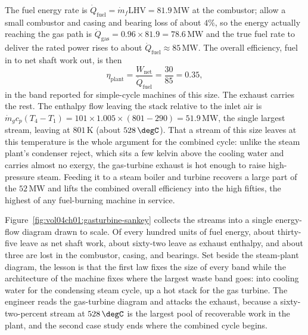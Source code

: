The fuel energy rate is $\dot{Q}_{\text{fuel}} = \dot{m}_f \text{LHV} =
81.9\,\text{MW}$ at the combustor; allow a small combustor and casing and
bearing loss of about $4\%$, so the energy actually reaching the gas path
is $\dot{Q}_{\text{gas}} = 0.96 \times 81.9 = 78.6\,\text{MW}$ and the
true fuel rate to deliver the rated power rises to about
$\dot{Q}_{\text{fuel}} \approx 85\,\text{MW}$. The overall efficiency,
fuel in to net shaft work out, is then
\[
\eta_{\text{plant}} = \frac{W_{\text{net}}}{\dot{Q}_{\text{fuel}}}
  = \frac{30}{85} = 0.35,
\]
in the band reported for simple-cycle machines of this size. The exhaust
carries the rest. The enthalpy flow leaving the stack relative to the
inlet air is $\dot{m}_g c_p (T_4 - T_1) = 101 \times 1.005 \times
(801 - 290) = 51.9\,\text{MW}$, the single largest stream, leaving at
$801\,\si{\kelvin}$ (about $528\,\degC$). That a stream of this size
leaves at this temperature is the whole argument for the combined cycle:
unlike the steam plant's condenser reject, which sits a few kelvin above
the cooling water and carries almost no exergy, the gas-turbine exhaust
is hot enough to raise high-pressure steam. Feeding it to a steam boiler
and turbine recovers a large part of the $52\,\text{MW}$ and lifts the
combined overall efficiency into the high fifties, the highest of any
fuel-burning machine in service.

Figure~\ref{fig:vol04ch01:gasturbine-sankey} collects the streams into a
single energy-flow diagram drawn to scale. Of every hundred units of fuel
energy, about thirty-five leave as net shaft work, about sixty-two leave
as exhaust enthalpy, and about three are lost in the combustor, casing,
and bearings. Set beside the steam-plant diagram, the lesson is that the
first law fixes the size of every band while the architecture of the
machine fixes where the largest waste band goes: into cooling water for
the condensing steam cycle, up a hot stack for the gas turbine. The
engineer reads the gas-turbine diagram and attacks the exhaust, because a
sixty-two-percent stream at $528\,\degC$ is the largest pool of
recoverable work in the plant, and the second case study ends where the
combined cycle begins.



